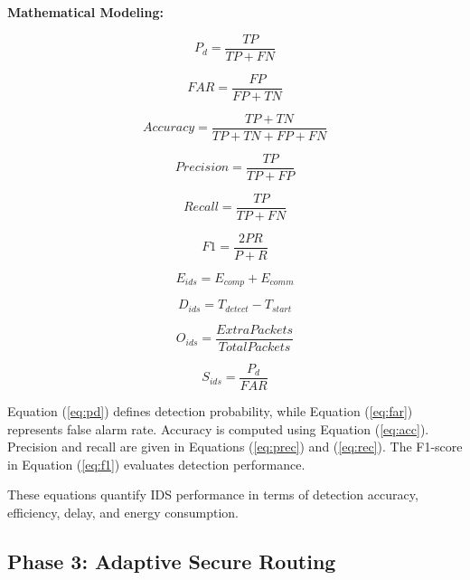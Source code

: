 \documentclass[a4paper,fleqn]{cas-dc}
\numberwithin{equation}{section}
\begin{document}
\textbf{Mathematical Modeling:}

\begin{equation}
P_d = \frac{TP}{TP + FN}
\label{eq:pd}
\end{equation}

\begin{equation}
FAR = \frac{FP}{FP + TN}
\label{eq:far}
\end{equation}

\begin{equation}
Accuracy = \frac{TP+TN}{TP+TN+FP+FN}
\label{eq:acc}
\end{equation}

\begin{equation}
Precision = \frac{TP}{TP+FP}
\label{eq:prec}
\end{equation}

\begin{equation}
Recall = \frac{TP}{TP+FN}
\label{eq:rec}
\end{equation}

\begin{equation}
F1 = \frac{2PR}{P+R}
\label{eq:f1}
\end{equation}

\begin{equation}
E_{ids} = E_{comp}+E_{comm}
\label{eq:ids_energy}
\end{equation}

\begin{equation}
D_{ids} = T_{detect}-T_{start}
\label{eq:ids_delay}
\end{equation}

\begin{equation}
O_{ids} = \frac{ExtraPackets}{TotalPackets}
\label{eq:ids_over}
\end{equation}

\begin{equation}
S_{ids} = \frac{P_d}{FAR}
\label{eq:ids_security}
\end{equation}

Equation (\ref{eq:pd}) defines detection probability, while Equation (\ref{eq:far}) represents false alarm rate. Accuracy is computed using Equation (\ref{eq:acc}). Precision and recall are given in Equations (\ref{eq:prec}) and (\ref{eq:rec}). The F1-score in Equation (\ref{eq:f1}) evaluates detection performance.

These equations quantify IDS performance in terms of detection accuracy, efficiency, delay, and energy consumption.

\subsection{Phase 3: Adaptive Secure Routing}
\end{document}
